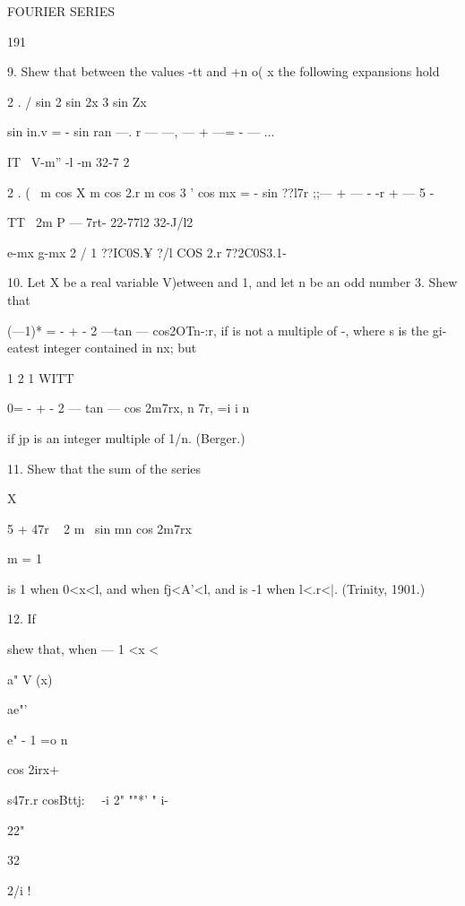 {FOURIER SERIES



191



9. Shew that between the values -tt and +n o( x the following
expansions hold

2 . / sin 2 sin 2x 3 sin Zx

sin in.v = - sin ran —. r — —, — + —= - — ...

IT \ V-m'' -l -m 32-7 2

2 . ( \ m cos X m cos 2.r m cos 3 ' cos mx = - sin ??l7r ;;— + — - -r
+ — 5 -

TT \ 2m P — 7rt- 22-77l2 32-J/l2

e-mx g-mx 2 / 1 ??IC0S.¥ ?/l COS 2.r 7?2C0S3.1- \

10. Let X be a real variable V)etween and 1, and let n be an odd
number 3. Shew that

(—1)* = - + - 2 —tan — cos2OTn-:r, if is not a multiple of -, where s
is the gi-eatest integer contained in nx; but

 1 2 1 WITT

0= - + - 2 — tan — cos 2m7rx, n 7r, =i i n

if jp is an integer multiple of 1/n. (Berger.)

11. Shew that the sum of the series

X

 5 + 47r ~ 2 m~ sin mn cos 2m7rx

m = 1

is 1 when 0<x<l, and when fj<A'<l, and is -1 when l<.r<|. (Trinity,
1901.)



12. If



shew that, when — 1 <x <\,



a" V (x)



ae"'



e" - 1 =o n



cos 2irx+



s47r.r cosBttj: \ \ -i 2" ""*' " i-



22"



32



2/i !



}

